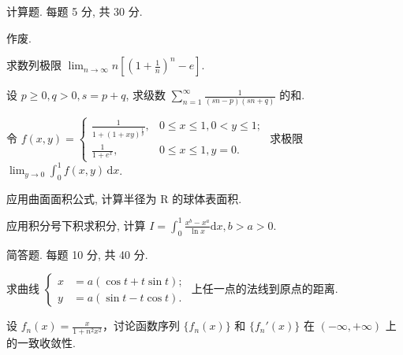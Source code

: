 \par{}
计算题. 每题 5 分, 共 30 分.\par
作废.\par
求数列极限 $\lim_{n\to \infty}n\left[\left(1 + \frac{1}{n}\right)^n -e\right].$\par
设 $p \geq 0, q > 0, s = p + q$, 求级数 $\sum_{n=1}^{\infty} \frac{1}{(sn - p)(sn + q)}$ 的和.\par
令 $f(x, y) = \begin{cases} \frac{1}{1 + (1 + xy)^{\frac{1}{y}}}, & 0 \leq x \leq 1, 0 < y \leq 1; \\ \frac{1}{1 + e^x}, & 0 \leq x \leq 1, y = 0. \end{cases}$ 求极限 $\lim_{y \to 0} \int_0^1 f(x, y) \, \mathrm{d}x$.\par
应用曲面面积公式, 计算半径为 R 的球体表面积.\par
应用积分号下积求积分, 计算 $I = \int_{0}^{1} \frac{x^{b} - x^{a}}{\ln x} \mathrm{d}x, b > a > 0$.\par
\par{}
简答题. 每题 10 分, 共 40 分.\par
求曲线  $\left\{\begin{aligned}x &= a(\cos t + t \sin t); \\ y &= a(\sin t - t \cos t).\end{aligned}\right.$  上任一点的法线到原点的距离.\par
设 $f_{n}(x) = \frac{x}{1 + n^{2}x^{2}}$，讨论函数序列 $\{f_{n}(x)\}$ 和 $\{f_{n}'(x)\}$ 在 $(- \infty, +\infty)$ 上的一致收敛性.\par
\par{}
